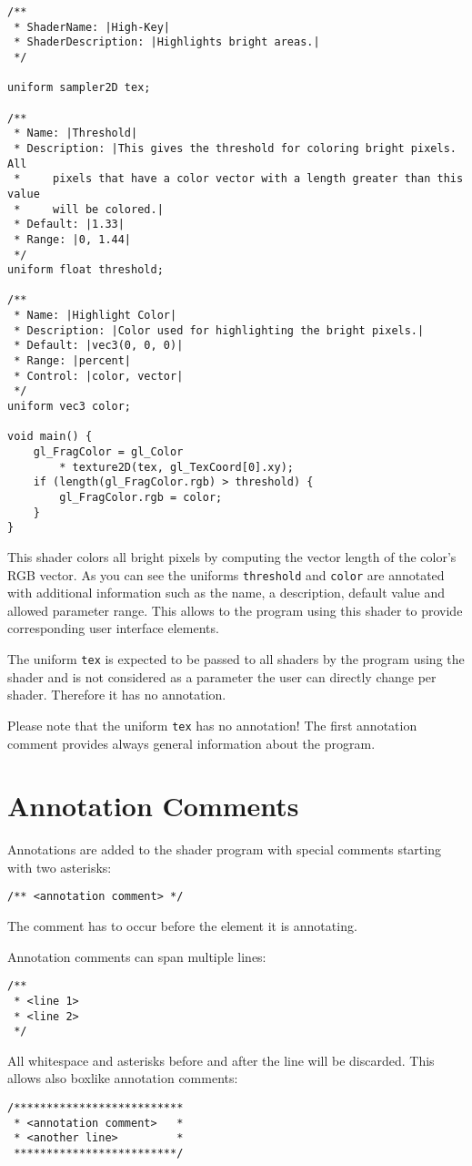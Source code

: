 \documentclass[11pt,a4paper]{scrreprt}
\begin{document}
\begin{lstlisting}
/**
 * ShaderName: |High-Key|
 * ShaderDescription: |Highlights bright areas.|
 */

uniform sampler2D tex;

/**
 * Name: |Threshold|
 * Description: |This gives the threshold for coloring bright pixels. All
 *     pixels that have a color vector with a length greater than this value
 *     will be colored.|
 * Default: |1.33|
 * Range: |0, 1.44|
 */
uniform float threshold;

/**
 * Name: |Highlight Color|
 * Description: |Color used for highlighting the bright pixels.|
 * Default: |vec3(0, 0, 0)|
 * Range: |percent|
 * Control: |color, vector|
 */
uniform vec3 color;

void main() {
    gl_FragColor = gl_Color
        * texture2D(tex, gl_TexCoord[0].xy);
    if (length(gl_FragColor.rgb) > threshold) {
        gl_FragColor.rgb = color;
    }
}
\end{lstlisting}
This shader colors all bright pixels by computing the vector length of the 
color's RGB vector. As you can see the uniforms \lstinline$threshold$ and 
\lstinline$color$ are annotated with additional information such as the name, 
a description, default value and allowed parameter range. This allows to the 
program using this shader to provide corresponding user interface elements.

The uniform \lstinline$tex$ is expected to be passed to all shaders by the 
program using the shader and is not considered as a parameter the user can 
directly change per shader. Therefore it has no annotation.

Please note that the uniform \lstinline$tex$ has no annotation! The first 
annotation comment provides always general information about the program.

\chapter{Annotation Comments}
Annotations are added to the shader program with special comments starting with 
two asterisks:
\begin{lstlisting}
/** <annotation comment> */
\end{lstlisting}
The comment has to occur before the element it is annotating.

Annotation comments can span multiple lines:
\begin{lstlisting}
/**
 * <line 1>
 * <line 2>
 */
\end{lstlisting}
All whitespace and asterisks before and after the line will be discarded. This 
allows also boxlike annotation comments:
\begin{lstlisting}
/**************************
 * <annotation comment>   *
 * <another line>         *
 *************************/
\end{lstlisting}
\end{document}
